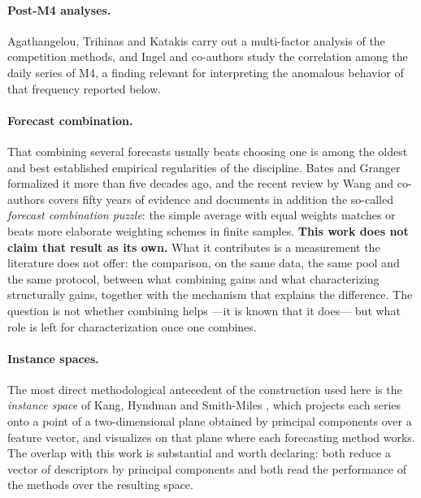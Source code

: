 \paragraph{Post-M4 analyses.} Agathangelou, Trihinas and Katakis \cite{agathangelou2020}
carry out a multi-factor analysis of the competition methods, and Ingel and co-authors
\cite{ingel2020} study the correlation among the daily series of M4, a finding relevant
for interpreting the anomalous behavior of that frequency reported below.

\paragraph{Forecast combination.} That combining several forecasts usually beats choosing
one is among the oldest and best established empirical regularities of the discipline.
Bates and Granger \cite{bates1969} formalized it more than five decades ago, and the
recent review by Wang and co-authors \cite{wang2023} covers fifty years of evidence and
documents in addition the so-called \emph{forecast combination puzzle}: the simple average
with equal weights matches or beats more elaborate weighting schemes in finite samples.
\textbf{This work does not claim that result as its own.} What it contributes is a
measurement the literature does not offer: the comparison, on the same data, the same pool
and the same protocol, between what combining gains and what characterizing structurally
gains, together with the mechanism that explains the difference. The question is not
whether combining helps ---it is known that it does--- but what role is left for
characterization once one combines.

\paragraph{Instance spaces.} The most direct methodological antecedent of the construction
used here is the \emph{instance space} of Kang, Hyndman and Smith-Miles \cite{kang2017},
which projects each series onto a point of a two-dimensional plane obtained by principal
components over a feature vector, and visualizes on that plane where each forecasting
method works. The overlap with this work is substantial and worth declaring: both reduce a
vector of descriptors by principal components and both read the performance of the methods
over the resulting space.

